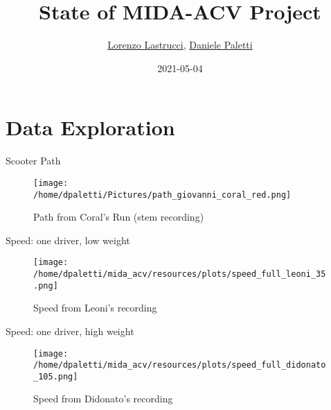 \documentclass[presentation]{beamer}
\author{\href{mailto:lorenzo.lastrucci@mail.polimi.it}{Lorenzo Lastrucci}, \href{mailto:daniele.paletti@mail.polimi.it}{Daniele Paletti}}
\date{2021-05-04}
\title{State of MIDA-ACV Project}
\institute[Politecnico di Milano]{Politecnico di Milano}
\begin{document}
\maketitle

\section{Data Exploration}
\label{sec:orgbfebfc1}
\begin{frame}[label={sec:org040ff2d}]{Scooter Path}
\begin{figure}[htbp]
\centering
\texttt{[image: /home/dpaletti/Pictures/path\_giovanni\_coral\_red.png]}
\caption{\label{fig:path_giovanni_coral}Path from Coral's Run (stem recording)}
\end{figure}
\end{frame}
\begin{frame}[label={sec:org429417e}]{Speed: one driver, low weight}
\begin{figure}[htbp]
\centering
\texttt{[image: /home/dpaletti/mida\_acv/resources/plots/speed\_full\_leoni\_35.png]}
\caption{\label{fig:speed_jessica}Speed from Leoni's recording}
\end{figure}
\end{frame}
\begin{frame}[label={sec:org4efab1e}]{Speed: one driver, high weight}
\begin{figure}[htbp]
\centering
\texttt{[image: /home/dpaletti/mida\_acv/resources/plots/speed\_full\_didonato\_105.png]}
\caption{\label{fig:speed_jessica}Speed from Didonato's recording}
\end{figure}
\end{frame}
\end{document}

